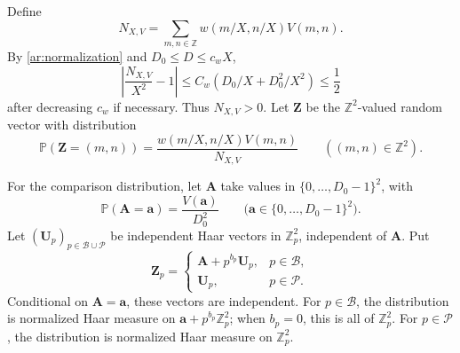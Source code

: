 \documentclass[twoside]{aomart}
\theoremstyle{paperplain}
\theoremstyle{paperdefinition}
\newcommand{\Z}{\mathbb Z}
\newcommand{\Pp}{\mathbb P}
\numberwithin{equation}{section}
\begin{document}
Define
\begin{equation*}
 N_{X,V}=\sum_{m,n\in\Z}w(m/X,n/X)V(m,n).
 \end{equation*}
By \eqref{ar:normalization} and $D_0\le D\le c_wX$,
\begin{equation}
 \left|\frac{N_{X,V}}{X^2}-1\right|
 \le C_w(D_0/X+D_0^2/X^2)\le\frac12
 \label{ar:matching-positive-normalization}
\end{equation}
after decreasing $c_w$ if necessary. Thus $N_{X,V}>0$.
Let $\mathbf Z$ be the $\Z^2$-valued random vector with distribution
\begin{equation*}
 \Pp(\mathbf Z=(m,n))
 =\frac{w(m/X,n/X)V(m,n)}{N_{X,V}}
 \qquad((m,n)\in\Z^2).
 \end{equation*}

For the comparison distribution, let $\mathbf A$ take values in
$\{0,\ldots,D_0-1\}^2$, with
\begin{equation*}
 \Pp(\mathbf A=\mathbf a)=\frac{V(\mathbf a)}{D_0^2}
 \qquad\bigl(\mathbf a\in\{0,\ldots,D_0-1\}^2\bigr).
 \end{equation*}
Let $(\mathbf U_p)_{p\in\mathcal B\cup\mathcal P}$ be
independent Haar vectors in $\Z_p^2$, independent of $\mathbf A$.
Put
\begin{equation*}
 \mathbf Z_p=
 \begin{cases}
 \mathbf A+p^{b_p}\mathbf U_p,&p\in\mathcal B,\\
 \mathbf U_p,&p\in\mathcal P.
 \end{cases}
 \end{equation*}
Conditional on $\mathbf A=\mathbf a$, these vectors are independent.
For $p\in\mathcal B$, the distribution is normalized Haar measure
on $\mathbf a+p^{b_p}\Z_p^2$; when $b_p=0$, this is all of $\Z_p^2$.
For $p\in\mathcal P$, the distribution is normalized Haar measure
on $\Z_p^2$.
\end{document}
